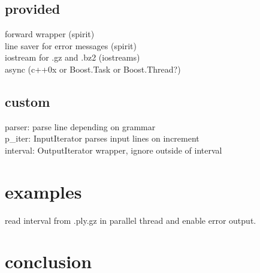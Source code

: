 \documentclass[a4paper,parskip=half]{scrartcl}
\begin{document}
\subsection{provided}
forward wrapper (spirit)\\
line saver for error messages (spirit)\\
iostream for .gz and .bz2 (iostreams)\\
async (c++0x or Boost.Task or Boost.Thread?)\\

\subsection{custom}
parser: parse line depending on grammar\\
p\_iter: InputIterator parses input lines on increment\\
interval: OutputIterator wrapper, ignore outside of interval\\

\section{examples}
read interval from .ply.gz in parallel thread and enable error output.

\section{conclusion}
\end{document}
